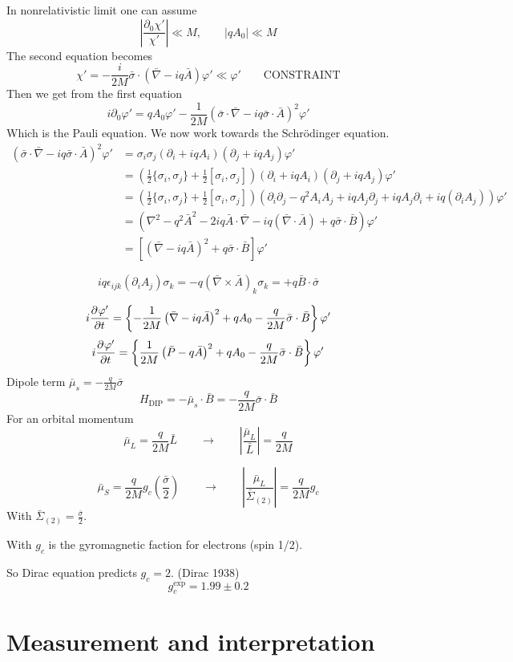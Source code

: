 In nonrelativistic limit one can assume
\[ \left|\frac{\partial_0\chi'}{\chi'}\right|\ll M, \qquad |qA_0| \ll M \]
The second equation becomes
\[ \chi' = - \frac{i}{2M}\bar{\sigma}\cdot \left(\bar{\nabla}-iq \bar{A}\right)\varphi' \ll \varphi' \qquad \text{CONSTRAINT}\]
Then we get from the first equation
\[ i\partial_0\varphi' = qA_0 \varphi' - \frac{1}{2M}\left(\bar{\sigma}\cdot \bar{\nabla}-iq\bar{\sigma}\cdot \bar{A}\right)^2\varphi' \]
Which is the Pauli equation. We now work towards the Schrödinger equation.
\begin{align*} \left(\bar{\sigma}\cdot \bar{\nabla}-iq\bar{\sigma}\cdot \bar{A}\right)^2\varphi' &= \sigma_i\sigma_j (\partial_i + iqA_i)(\partial_j + iqA_j)\varphi' \\
&= \left(\frac{1}{2}\{\sigma_i,\sigma_j\}+ \frac{1}{2}[\sigma_i,\sigma_j]\right)\left(\partial_i + iqA_i\right)\left(\partial_j + iqA_j\right)\varphi' \\
&=  \left(\frac{1}{2}\{\sigma_i,\sigma_j\}+ \frac{1}{2}[\sigma_i,\sigma_j]\right)\left(\partial_i\partial_j - q^2A_iA_j + iqA_j\partial_j + iqA_j\partial_i+ iq(\partial_iA_j)\right)\varphi' \\
&= \left(\nabla^2 - q^2 \bar{A}^2 - 2iq \bar{A}\cdot \bar{\nabla} - iq(\bar{\nabla}\cdot\bar{A})+ q \bar{\sigma}\cdot\bar{B}\right)\varphi' \\
&= \left[\left(\bar{\nabla}-iq \bar{A}\right)^2 + q\bar{\sigma}\cdot\bar{B}\right]\varphi'
\end{align*}

\[ iq\epsilon_{ijk}(\partial_iA_j)\sigma_k = -q(\bar{\nabla}\times \bar{A})_k \sigma_k = + q \bar{B}\cdot \bar{\sigma} \]

\[ i  \frac{\partial{^{}}\varphi'}{\partial{{t}^{}}}  = \left\{- \frac{1}{2M}\left(\bar{\nabla}-iq \bar{A}\right)^2 + q A_0 - \frac{q}{2M}\bar{\sigma}\cdot\bar{B}\right\}\varphi' \]
\[ i  \frac{\partial{^{}}\varphi'}{\partial{{t}^{}}}  = \left\{\frac{1}{2M}\left(\bar{P}-q \bar{A}\right)^2 + q A_0 - \frac{q}{2M}\bar{\sigma}\cdot\bar{B}\right\}\varphi' \]
Dipole term $\bar{\mu}_s = - \frac{q}{2M}\bar{\sigma}$
\[ H_{\text{DIP}} = -\bar{\mu}_s\cdot \bar{B} = - \frac{q}{2M}\bar{\sigma}\cdot\bar{B} \]
For an orbital momentum
\[ \bar{\mu}_L = \frac{q}{2M}\bar{L} \qquad \to \qquad \left|\frac{\bar{\mu}_L}{\bar{L}}\right|= \frac{q}{2M} \]

\[ \bar{\mu}_S = \frac{q}{2M}g_c \left(\frac{\bar{\sigma}}{2}\right) \qquad \to \qquad \left|\frac{\bar{\mu}_L}{\bar{\Sigma}_{(2)}}\right| = \frac{q}{2M}g_c \]
With $\bar{\Sigma}_{(2)} = \frac{\bar{\sigma}}{2}$.

With $g_c$ is the gyromagnetic faction for electrons (spin 1/2).

So Dirac equation predicts $g_c = 2$. (Dirac 1938)
\[ g_c^{\text{exp}} = 1.99 \pm 0.2 \]




\chapter{Measurement and interpretation}